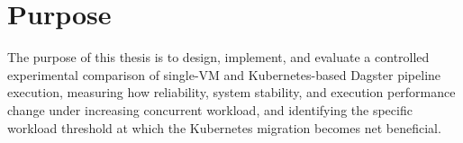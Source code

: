 
\section{Purpose}
\label{sec:purpose}

The purpose of this thesis is to design, implement, and evaluate a controlled experimental comparison of single-VM and Kubernetes-based Dagster pipeline execution, measuring how reliability, system stability, and execution performance change under increasing concurrent workload, and identifying the specific workload threshold at which the Kubernetes migration becomes net beneficial.
